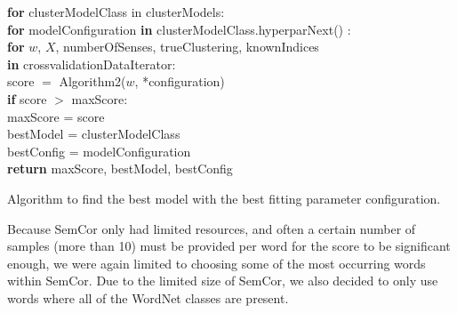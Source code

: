 \documentclass[a4paper,12pt,twoside,openright]{report}
\begin{document}
\begin{algorithm}[H]
\SetAlgoLined
{}

\textbf{for} clusterModelClass in clusterModels:  \\
\quad \quad \textbf{for} modelConfiguration \textbf{in} clusterModelClass.hyperparNext() :  \\
\quad \quad \quad \quad \textbf{for} $w$, $X$, numberOfSenses, trueClustering, knownIndices \\
\quad \quad \quad \quad \textbf{in} crossvalidationDataIterator:  \\

\quad \quad \quad \quad \quad \quad score $=$ Algorithm2($w$, *configuration) \\
\quad \quad \quad \quad \quad \quad \textbf{if} score $>$ maxScore: \\
\quad \quad \quad \quad \quad \quad \quad \quad  maxScore = score \\
\quad \quad \quad \quad \quad \quad \quad \quad  bestModel = clusterModelClass \\
\quad \quad \quad \quad \quad \quad \quad \quad  bestConfig = modelConfiguration \\

\textbf{return} maxScore, bestModel, bestConfig
 
 \caption{Algorithm to find the best model with the best fitting parameter configuration.}
\end{algorithm}

Because SemCor only had limited resources, and often a certain number of samples (more than 10) must be provided per word for the score to be significant enough, we were again limited to choosing some of the most occurring words within SemCor.
Due to the limited size of SemCor, we also decided to only use words where all of the WordNet classes are present.
\end{document}
